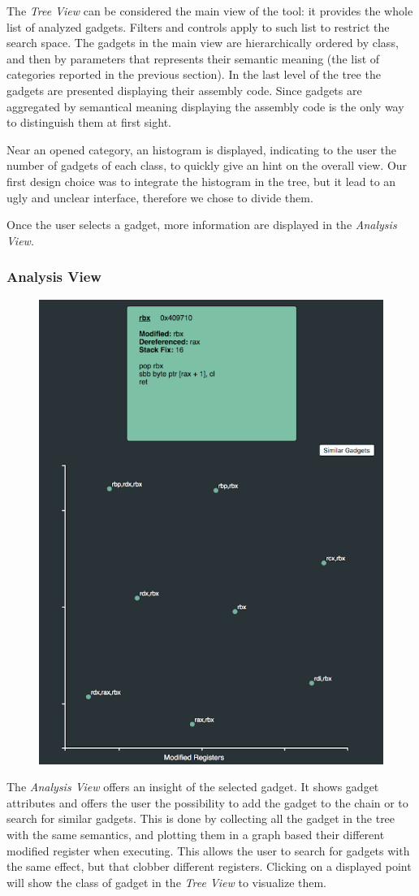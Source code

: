 \documentclass[twocolumn, 11pt]{article}
\begin{document}
The \textit{Tree View} can be considered the main view of the tool: it provides the whole list of analyzed gadgets. Filters and controls apply to such list to restrict the search space. The gadgets in the main view are hierarchically ordered by class, and then by parameters that represents their semantic meaning (the list of categories reported in the previous section). In the last level of the tree the gadgets are presented displaying their assembly code. Since gadgets are aggregated by semantical meaning displaying the assembly code is the only way to distinguish them at first sight.

Near an opened category, an histogram is displayed, indicating to the user the number of gadgets of each class, to quickly give an hint on the overall view. Our first design choice was to integrate the histogram in the tree, but it lead to an ugly and unclear interface, therefore we chose to divide them.

Once the user selects a gadget, more information are displayed in the \textit{Analysis View}.

\subsubsection{Analysis View}
\begin{figure}[htb]
  \centering
  \includegraphics[width=0.6\linewidth]{analysis-view}
\end{figure}

The \textit{Analysis View} offers an insight of the selected gadget. It shows gadget attributes and offers the user the possibility to add the gadget to the chain or to search for similar gadgets. This is done by collecting all the gadget in the tree with the same semantics, and plotting them in a graph based their different modified register when executing. This allows the user to search for gadgets with the same effect, but that clobber different registers. Clicking on a displayed point will show the class of gadget in the \textit{Tree View} to visualize them.
\end{document}
